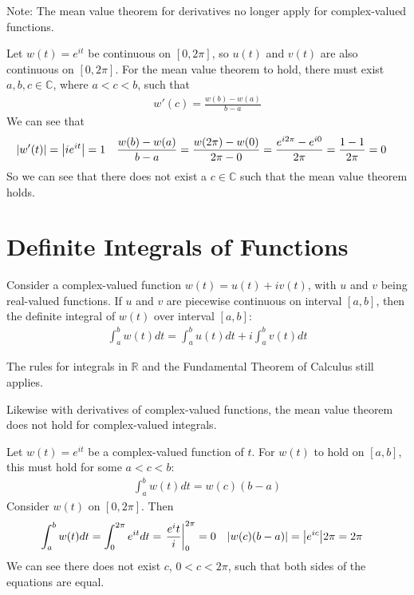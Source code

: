 \documentclass[12pt, english]{book}
\begin{document}
	Note: The mean value theorem for derivatives no longer apply for complex-valued functions. 
	\begin{example}
		Let \(w(t)= e^{it}\) be continuous on \([0, 2\pi]\), so \(u(t)\) and \(v(t)\) are also continuous on \([0,2\pi]\). For the mean value theorem to hold, there must exist \(a, b, c \in \mathbb{C}\), where \(a < c < b\), such that 
		\begin{align*}
			w'(c) = \frac{w(b) - w(a)}{b-a}
		\end{align*}
		We can see that 
		\begin{align*}
			\abs{w'(t)} &= \abs{ie^{it}} = 1 &
			\frac{w(b) - w(a)}{b-a} &= \frac{w(2\pi) - w(0)}{2\pi - 0} = \frac{e^{i2\pi} - e^{i0}}{2\pi} = \frac{1 - 1}{2\pi} = 0
		\end{align*}
		So we can see that there does not exist a \(c \in \mathbb{C}\) such that the mean value theorem holds.
	\end{example}
	
	\section{Definite Integrals of Functions} \label{Definite Integrals of Functions Section - Complex}
	
	\begin{definition}
		\label{Definite Integral of Complex-Valued Function Definition - Complex}
		Consider a complex-valued function \(w(t) = u(t) + iv(t)\), with \(u\) and \(v\) being real-valued functions. If \(u\) and \(v\) are piecewise continuous on interval \([a,b]\), then the definite integral of \(w(t)\) over interval \([a, b]\):
		\begin{align*}
			\int_{a}^{b} w(t) dt = \int_{a}^{b} u(t) dt + i \int_{a}^{b} v(t) dt
		\end{align*}
	\end{definition}
	The rules for integrals in \(\mathbb{R}\) and the Fundamental Theorem of Calculus still applies.
	
	Likewise with derivatives of complex-valued functions, the mean value theorem does not hold for complex-valued integrals.
	\begin{example}
		Let \(w(t) = e^{it}\) be a complex-valued function of \(t\). For \(w(t)\) to hold on \([a, b]\), this must hold for some \(a < c < b\):
		\begin{align*}
			\int_{a}^{b} w(t) dt = w(c)(b-a)
		\end{align*}
		Consider \(w(t)\) on \([0, 2\pi]\). Then
		\begin{align*}
			\int_{a}^{b} w(t) dt 
			&= \int_{0}^{2\pi} e^{it} dt = \eval{\frac{e^it}{i}}_{0}^{2\pi} = 0 &
			\abs{w(c)(b-a)} &= \abs{e^{ic}} 2 \pi = 2\pi
		\end{align*}
		 We can see there does not exist \(c\), \(0 < c < 2\pi\), such that both sides of the equations are equal. 
	\end{example}
	
\end{document}
